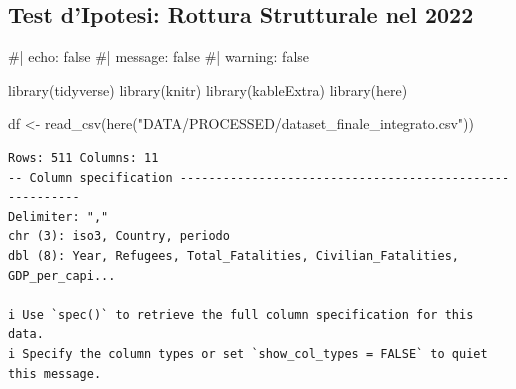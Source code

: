 \documentclass[
  letterpaper,
  DIV=11,
  numbers=noendperiod]{scrartcl}
\newenvironment{Shaded}{\begin{snugshade}}{\end{snugshade}}
\newcommand{\CommentTok}[1]{\textcolor[rgb]{0.37,0.37,0.37}{#1}}
\newcommand{\FunctionTok}[1]{\textcolor[rgb]{0.28,0.35,0.67}{#1}}
\newcommand{\NormalTok}[1]{\textcolor[rgb]{0.00,0.23,0.31}{#1}}
\newcommand{\OtherTok}[1]{\textcolor[rgb]{0.00,0.23,0.31}{#1}}
\newcommand{\StringTok}[1]{\textcolor[rgb]{0.13,0.47,0.30}{#1}}
\begin{document}
\subsection{Test d'Ipotesi: Rottura Strutturale nel
2022}\label{test-dipotesi-rottura-strutturale-nel-2022}

\begin{Shaded}
\begin{Highlighting}[]
\CommentTok{\#| echo: false}
\CommentTok{\#| message: false}
\CommentTok{\#| warning: false}

\FunctionTok{library}\NormalTok{(tidyverse)}
\FunctionTok{library}\NormalTok{(knitr)}
\FunctionTok{library}\NormalTok{(kableExtra)}
\FunctionTok{library}\NormalTok{(here)}

\NormalTok{df }\OtherTok{\textless{}{-}} \FunctionTok{read\_csv}\NormalTok{(}\FunctionTok{here}\NormalTok{(}\StringTok{"DATA/PROCESSED/dataset\_finale\_integrato.csv"}\NormalTok{))}
\end{Highlighting}
\end{Shaded}

\begin{verbatim}
Rows: 511 Columns: 11
-- Column specification --------------------------------------------------------
Delimiter: ","
chr (3): iso3, Country, periodo
dbl (8): Year, Refugees, Total_Fatalities, Civilian_Fatalities, GDP_per_capi...

i Use `spec()` to retrieve the full column specification for this data.
i Specify the column types or set `show_col_types = FALSE` to quiet this message.
\end{verbatim}
\end{document}
